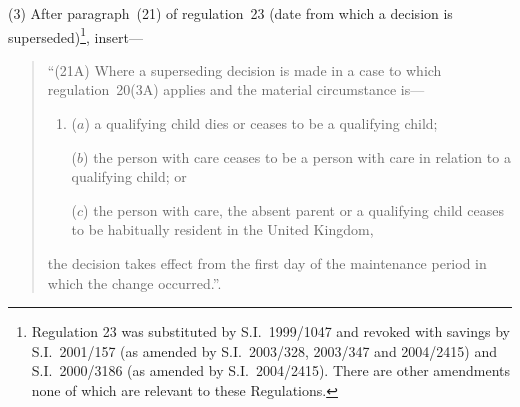 \documentclass[12pt,a4paper]{article}
\begin{document}
(3) After paragraph~(21) of regulation~23 (date from which a decision is superseded)\footnote{Regulation 23 was substituted by S.I.~1999/1047 and revoked with savings by S.I.~2001/157 (as amended by S.I.~2003/328, 2003/347 and 2004/2415) and S.I.~2000/3186 (as amended by S.I.~2004/2415). There are other amendments none of which are relevant to these Regulations.}, insert—
\begin{quotation}
“(21A) Where a superseding decision is made in a case to which regulation~20(3A) applies and the material circumstance is—
\begin{enumerate}\item[]
($a$) a qualifying child dies or ceases to be a qualifying child;

($b$) the person with care ceases to be a person with care in relation to a qualifying child; or

($c$) the person with care, the absent parent or a qualifying child ceases to be habitually resident in the United Kingdom,
\end{enumerate}
the decision takes effect from the first day of the maintenance period in which the change occurred.”.
\end{quotation}
\end{document}
